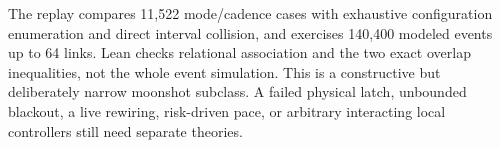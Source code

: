 \documentclass[11pt]{article}
\begin{document}
The replay compares 11,522 mode/cadence cases with exhaustive
configuration enumeration and direct interval collision,
and exercises 140,400 modeled events up to 64 links.
Lean checks relational association and the two exact
overlap inequalities, not the whole event simulation.
This is a constructive but deliberately narrow moonshot
subclass. A failed physical latch, unbounded blackout, a
live rewiring, risk-driven pace, or arbitrary interacting
local controllers still need separate theories.
\end{document}
